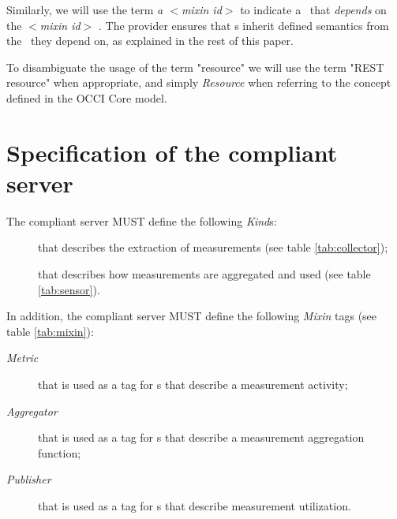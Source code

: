 \documentclass[10pt,a4paper]{article}
\begin{document}
Similarly, we will use the term {\em a $<$mixin id$>$ \mi} to indicate a \mi\ that {\em depends} on the {\em $<$mixin id$>$} \mi. The provider ensures that \mi s inherit defined semantics from the \mi\ they depend on, as explained in the rest of this paper. 

To disambiguate the usage of the term "resource" we will use the term "REST resource" when appropriate, and simply {\em Resource} when referring to the concept defined in the OCCI Core model.

\section{Specification of the compliant server}

The compliant server MUST define the following {\em Kind}s:

\begin{description}

\item [\coll] that describes the extraction of measurements (see table \ref{tab:collector});

\item [\sens] that describes how measurements are aggregated and used (see table  \ref{tab:sensor}).

\end{description}
 

In addition, the compliant server MUST define the following {\em Mixin} tags (see table \ref{tab:mixin}): 

\begin{description}

\item [{\em Metric}] that is used as a tag for \mi s that describe a measurement activity;

\item [{\em Aggregator}] that is used as a tag for \mi s that describe a measurement aggregation function;

\item [{\em Publisher}] that is used as a tag for \mi s that describe measurement utilization.

\end{description}
\end{document}

